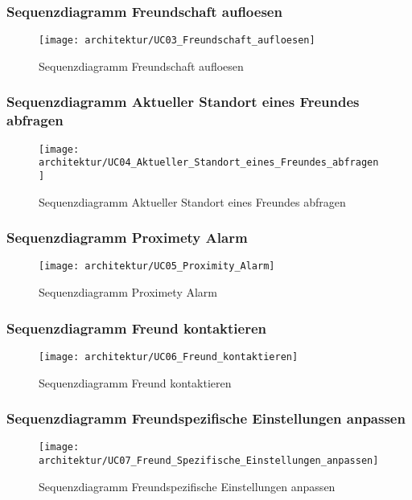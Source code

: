 \pagebreak
\subsubsection{Sequenzdiagramm Freundschaft aufloesen}
\begin{figure}[H]
	\centering
		\texttt{[image: architektur/UC03\_Freundschaft\_aufloesen]}
	\caption{Sequenzdiagramm Freundschaft aufloesen}
	\label{fig:UC03_Freundschaft_aufloesen}
\end{figure}
\FloatBarrier



\pagebreak
\subsubsection{Sequenzdiagramm Aktueller Standort eines Freundes abfragen}
\begin{figure}[H]
	\centering
		\texttt{[image: architektur/UC04\_Aktueller\_Standort\_eines\_Freundes\_abfragen]}
	\caption{Sequenzdiagramm Aktueller Standort eines Freundes abfragen}
	\label{fig:UC04_Aktueller_Standort_eines_Freundes_abfragen}
\end{figure}
\FloatBarrier



\pagebreak
\subsubsection{Sequenzdiagramm Proximety Alarm}
\begin{figure}[H]
	\centering
		\texttt{[image: architektur/UC05\_Proximity\_Alarm]}
	\caption{Sequenzdiagramm Proximety Alarm}
	\label{fig:UC05_Proximity_Alarm}
\end{figure}
\FloatBarrier



\pagebreak
\subsubsection{Sequenzdiagramm Freund kontaktieren}
\begin{figure}[H]
	\centering
		\texttt{[image: architektur/UC06\_Freund\_kontaktieren]}
	\caption{Sequenzdiagramm Freund kontaktieren}
	\label{fig:UC06_Freund_kontaktieren}
\end{figure}
\FloatBarrier



\pagebreak
\subsubsection{Sequenzdiagramm Freundspezifische Einstellungen anpassen}
\begin{figure}[H]
	\centering
		\texttt{[image: architektur/UC07\_Freund\_Spezifische\_Einstellungen\_anpassen]}
	\caption{Sequenzdiagramm Freundspezifische Einstellungen anpassen}
	\label{fig:UC07_Freund_Spezifische_Einstellungen_anpassen}
\end{figure}
\FloatBarrier



